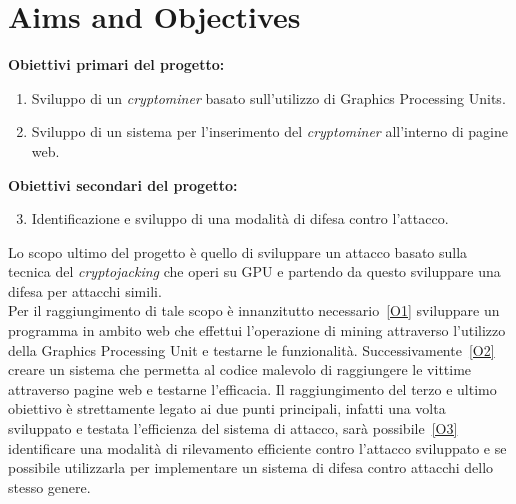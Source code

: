 \documentclass[
11pt, %
oneside, %
english, %
onehalfspacing,%
headsepline, %
]{MastersDoctoralThesis} %
\begin{document}
{\chapter{Aims and Objectives}}
\textbf{Obiettivi primari del progetto:}
\begin{enumerate}[label= (\roman*)]
        \item\label{O1} Sviluppo di un \emph{cryptominer} basato sull'utilizzo di Graphics Processing Units.
        \item\label{O2} Sviluppo di un sistema per l'inserimento del \emph{cryptominer} all'interno di pagine web.
\end{enumerate}
\textbf{Obiettivi secondari del progetto:}
\begin{enumerate}[label= (\roman*)]
        \setcounter{enumi}{2}
        \item\label{O3} Identificazione e sviluppo di una modalità di difesa contro l'attacco.
\end{enumerate}
Lo scopo ultimo del progetto è quello di sviluppare un attacco basato sulla tecnica del \emph{cryptojacking} che operi su GPU e partendo da questo sviluppare una difesa per attacchi simili.\\
Per il raggiungimento di tale scopo è innanzitutto necessario~\ref{O1} sviluppare un programma in ambito web che effettui l'operazione di mining attraverso l'utilizzo della Graphics Processing Unit e testarne le funzionalità. Successivamente~\ref{O2} creare un sistema che permetta al codice malevolo di raggiungere le vittime attraverso pagine web e testarne l'efficacia. Il raggiungimento del terzo e ultimo obiettivo è strettamente legato ai due punti principali, infatti una volta sviluppato e testata l'efficienza del sistema di attacco, sarà possibile~\ref{O3} identificare una modalità di rilevamento efficiente contro l'attacco sviluppato e se possibile utilizzarla per implementare un sistema di difesa contro attacchi dello stesso genere.
\end{document}
